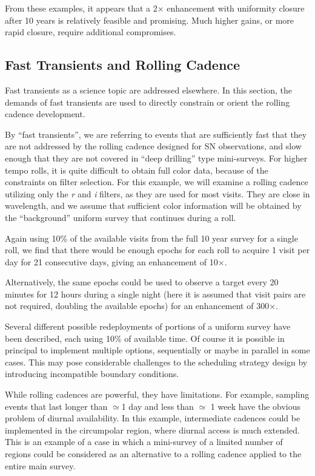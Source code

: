 From these examples, it appears that a 2$\times$ enhancement with
uniformity closure after 10 years is relatively feasible and promising.
Much higher gains, or more rapid closure, require additional
compromises.


\subsection{Fast Transients and Rolling Cadence}
\label{sec:rolling:transients}

Fast transients as a science topic are addressed elsewhere. In this
section, the demands of fast transients are used to directly constrain
or orient the rolling cadence development.

By ``fast transients'', we are referring to events that are sufficiently
fast that they are not addressed by the rolling cadence designed for SN
observations, and slow enough that they are not covered in ``deep
drilling'' type mini-surveys.  For higher tempo rolls, it is quite
difficult to obtain full color data, because of the constraints on
filter selection.  For this example, we will examine a rolling cadence
utilizing only the {\it r} and {\it i} filters, as they are used for
most visits. They are close in wavelength, and we assume that sufficient
color information will be obtained by the ``background'' uniform survey
that continues during a roll.

Again using 10\% of the available visits from the full 10 year survey
for a single roll, we find that there would be enough epochs for each
roll to acquire 1 visit per day for 21 consecutive days, giving an
enhancement of 10$\times$.

Alternatively, the same epochs could be used to observe a target every
20 minutes for 12 hours during a single night (here it is assumed that
visit pairs are not required, doubling the available epochs) for an
enhancement of 300$\times$.

Several different possible redeployments of portions of a uniform survey
have been described, each using 10\% of available time.  Of course it is
possible in principal to implement multiple options, sequentially or
maybe in parallel in some cases. This may pose considerable challenges
to the scheduling strategy design by introducing incompatible boundary
conditions.

While rolling cadences are powerful, they have limitations.  For
example, sampling events that last longer than $\simeq$1 day and less
than $\simeq$ 1 week have the obvious problem of diurnal availability.
In this example, intermediate cadences could be implemented in the
circumpolar region, where diurnal access is much extended.  This is an
example of a case in which a mini-survey of a limited number of regions
could be considered as an alternative to a rolling cadence applied to
the entire main survey.


